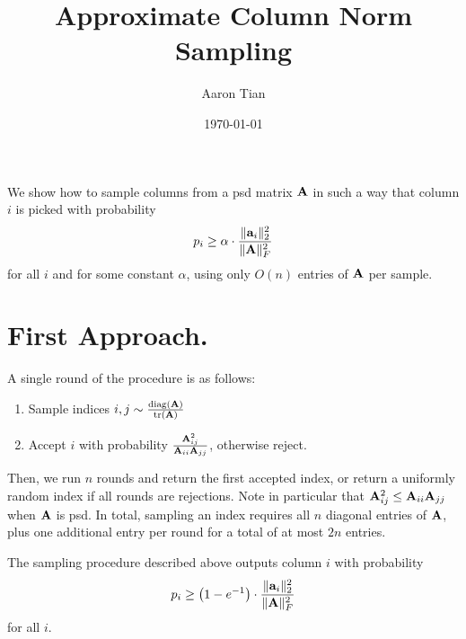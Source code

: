 \documentclass{article}
\title{Approximate Column Norm Sampling}
\author{Aaron Tian}
\date{\today}
\begin{document}
% 
\maketitle


We show how to sample columns from a psd matrix $\mathbf{A}$ in such a way that column $i$ is picked with probability
\[p_i \geq \alpha\cdot \frac{\|\mathbf{a}_i\|^2_2}{\|\mathbf{A}\|^2_F}\]
for all $i$ and for some constant $\alpha$, using only $O(n)$ entries of $\mathbf{A}$ per sample. 

\section*{First Approach.}
A single round of the procedure is as follows:
\begin{enumerate}
    \item Sample indices $i,j\sim \frac{\operatorname*{diag}(\mathbf{A})}{\tr(\mathbf{A})}$
    \item Accept $i$ with probability $\frac{\mathbf{A}_{ij}^2}{\mathbf{A}_{ii}\mathbf{A}_{jj}}$, otherwise reject.
\end{enumerate}
Then, we run $n$ rounds and return the first accepted index, or return a uniformly random index if all rounds are rejections. Note in particular that $\mathbf{A}_{ij}^2\leq \mathbf{A}_{ii}\mathbf{A}_{jj}$ when $\mathbf{A}$ is psd. In total, sampling an index requires all $n$ diagonal entries of $\mathbf{A}$, plus one additional entry per round for a total of at most $2n$ entries.

\begin{lemma}
    The sampling procedure described above outputs column $i$ with probability
    \[p_i \geq \left(1 - e^{-1}\right)\cdot \frac{\|\mathbf{a}_i\|^2_2}{\|\mathbf{A}\|^2_F}\]
    for all $i$.
\end{lemma}
\end{document}
